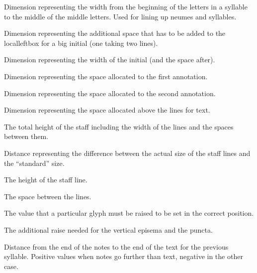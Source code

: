 Dimension representing the width from the beginning of the letters in
a syllable to the middle of the middle letters.  Used for lining up
neumes and syllables.
  
Dimension representing the additional space that has to be added to
the localleftbox for a big initial (one taking two lines).

Dimension representing the width of the initial (and the space after).

Dimension representing the space allocated to the first annotation.

Dimension representing the space allocated to the second annotation.

Dimension representing the space allocated above the lines for text.	

The total height of the staff including the width of the lines and the spaces between them.

Distance representing the difference between the actual size of the staff lines and the ``standard'' size.

The height of the staff line.

The space between the lines.

The value that a particular glyph must be raised to be set in the correct position.

The additional raise needed for the vertical episema and the puncta.

Distance from the end of the notes to the end of the text for the previous syllable.  Positive values when notes go further than text, negative in the other case.

